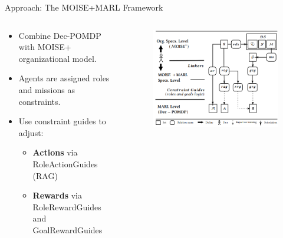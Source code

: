 \documentclass[9pt, aspectratio=169]{beamer}
\begin{document}
\begin{frame}{Approach: The MOISE+MARL Framework}

  \begin{columns}[c] %
    \begin{column}{0.4\textwidth}
      \begin{itemize}
        \item Combine Dec-POMDP with MOISE+ organizational model.
        \item Agents are assigned roles and missions as constraints.
        \item Use constraint guides to adjust:
              \begin{itemize}
                \item \textbf{Actions} via RoleActionGuides (RAG)
                \item \textbf{Rewards} via RoleRewardGuides and GoalRewardGuides
              \end{itemize}
      \end{itemize}
    \end{column}
    \begin{column}{0.6\textwidth}
      \begin{figure}
        \centering
        \includegraphics[width=1.\linewidth]{figures/mm_simple_representation.png}
      \end{figure}
    \end{column}
  \end{columns}
\end{frame}
\end{document}
